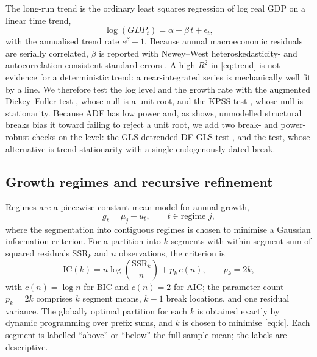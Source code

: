 \documentclass[11pt]{article}
\begin{document}
The long-run trend is the ordinary least squares regression of log real GDP on a
linear time trend,
\begin{equation}
  \log(GDP_t) = \alpha + \beta\, t + \epsilon_t,
  \label{eq:trend}
\end{equation}
with the annualised trend rate $e^{\beta}-1$. Because annual macroeconomic
residuals are serially correlated, $\beta$ is reported with Newey--West
heteroskedasticity- and autocorrelation-consistent standard errors
\citep{neweywest1987}. A high $R^2$ in \eqref{eq:trend} is not evidence for a
deterministic trend: a near-integrated series is mechanically well fit by a line.
We therefore test the log level and the growth rate with the augmented
Dickey--Fuller test \citep{saiddickey1984}, whose null is a unit root, and the
KPSS test \citep{kpss1992}, whose null is stationarity. Because ADF has low power
and, as \citet{perron1989} shows, unmodelled structural breaks bias it toward
failing to reject a unit root, we add two break- and power-robust checks on the
level: the GLS-detrended DF-GLS test \citep{elliott1996}, and the
\citet{zivotandrews1992} test, whose alternative is trend-stationarity with a
single endogenously dated break.

\subsection{Growth regimes and recursive refinement}

Regimes are a piecewise-constant mean model for annual growth,
\begin{equation}
  g_t = \mu_j + u_t, \qquad t \in \text{regime } j,
  \label{eq:regime}
\end{equation}
where the segmentation into contiguous regimes is chosen to minimise a Gaussian
information criterion. For a partition into $k$ segments with within-segment sum
of squared residuals $\mathrm{SSR}_k$ and $n$ observations, the criterion is
\begin{equation}
  \mathrm{IC}(k) = n \log\!\left(\frac{\mathrm{SSR}_k}{n}\right) + p_k \, c(n),
  \qquad p_k = 2k,
  \label{eq:ic}
\end{equation}
with $c(n) = \log n$ for BIC and $c(n) = 2$ for AIC; the parameter count $p_k=2k$
comprises $k$ segment means, $k-1$ break locations, and one residual variance. The
globally optimal partition for each $k$ is obtained exactly by dynamic
programming over prefix sums, and $k$ is chosen to minimise \eqref{eq:ic}. Each
segment is labelled ``above'' or ``below'' the full-sample mean; the labels are
descriptive.
\end{document}
